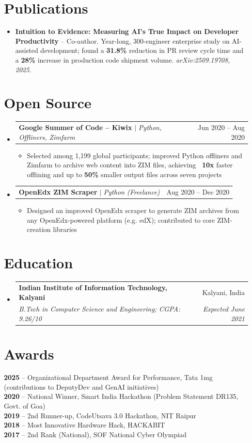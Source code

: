 \documentclass[letterpaper,11pt]{article}
\makeatletter
\newcommand{\resumeItem}[1]{
  \item\small{
    {#1 \vspace{-2pt}}
  }
}
\newcommand{\resumeSubheading}[4]{
  \vspace{-2pt}\item
    \begin{tabular*}{0.97\textwidth}[t]{l@{\extracolsep{\fill}}r}
      \textbf{#1} & #2 \\
      \textit{\small#3} & \textit{\small #4} \\
    \end{tabular*}\vspace{-7pt}
}
\newcommand{\resumeProjectHeading}[2]{
    \item
    \begin{tabular*}{0.97\textwidth}{l@{\extracolsep{\fill}}r}
      \small#1 & #2 \\
    \end{tabular*}\vspace{-7pt}
}
\newcommand{\resumeSubHeadingListStart}{\begin{itemize}[leftmargin=0.15in, label={}]}
\newcommand{\resumeSubHeadingListEnd}{\end{itemize}}
\newcommand{\resumeItemListStart}{\begin{itemize}}
\newcommand{\resumeItemListEnd}{\end{itemize}\vspace{-5pt}}
\makeatother
\begin{document}
\section{Publications}
  \resumeSubHeadingListStart
    \resumeItem{\textbf{Intuition to Evidence: Measuring AI's True Impact on Developer Productivity} -- Co-author. Year-long, 300-engineer enterprise study on AI-assisted development; found a \textbf{31.8\%} reduction in PR review cycle time and a \textbf{28\%} increase in production code shipment volume. \textit{arXiv:2509.19708, 2025.}}
  \resumeSubHeadingListEnd


\section{Open Source}
  \resumeSubHeadingListStart
    \resumeProjectHeading
      {\textbf{Google Summer of Code -- Kiwix} $|$ \emph{Python, Offliners, Zimfarm}}{Jun 2020 -- Aug 2020}
      \resumeItemListStart
        \resumeItem{Selected among 1,199 global participants; improved Python offliners and Zimfarm to archive web content into ZIM files, achieving \textbf{~10x} faster offlining and up to \textbf{50\%} smaller output files across seven projects}
      \resumeItemListEnd
    \resumeProjectHeading
      {\textbf{OpenEdx ZIM Scraper} $|$ \emph{Python (Freelance)}}{Aug 2020 -- Dec 2020}
      \resumeItemListStart
        \resumeItem{Designed an improved OpenEdx scraper to generate ZIM archives from any OpenEdx-powered platform (e.g. edX); contributed to core ZIM-creation libraries}
      \resumeItemListEnd
  \resumeSubHeadingListEnd


\section{Education}
  \resumeSubHeadingListStart
    \resumeSubheading
      {Indian Institute of Information Technology, Kalyani}{Kalyani, India}
      {B.Tech in Computer Science and Engineering; CGPA: 9.26/10}{Expected June 2021}
  \resumeSubHeadingListEnd


\section{Awards}
 \begin{itemize}[leftmargin=0.15in, label={}]
    \small{\item{
     \textbf{2025} -- Organizational Department Award for Performance, Tata 1mg (contributions to DeputyDev and GenAI initiatives) \\
     \textbf{2020} -- National Winner, Smart India Hackathon (Problem Statement DR135, Govt. of Goa) \\
     \textbf{2019} -- 2nd Runner-up, CodeUtsava 3.0 Hackathon, NIT Raipur \\
     \textbf{2018} -- Most Innovative Hardware Hack, HACKABIT \\
     \textbf{2017} -- 2nd Rank (National), SOF National Cyber Olympiad
    }}
 \end{itemize}
\end{document}
